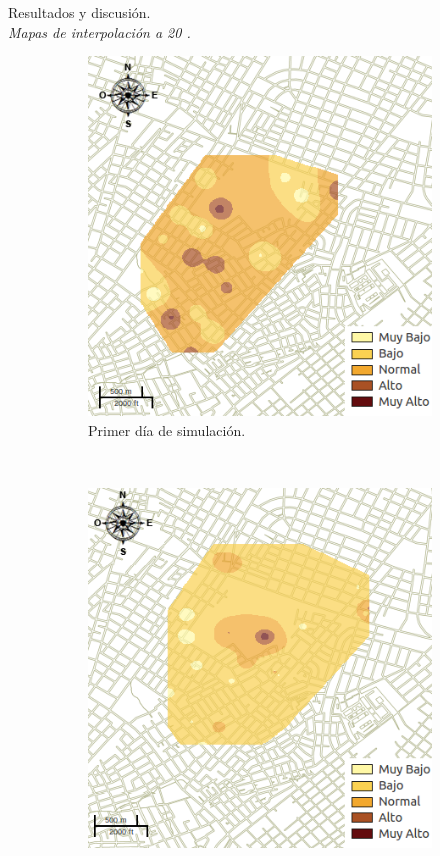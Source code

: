 \begin{frame}[t]{Resultados y discusión.\\\textit{Mapas de interpolación a 20 \textcelsius.}}
    \begin{figure}
    \begin{subfigure}[b]{0.45\textwidth}
        \includegraphics[width=\textwidth]{./graphics/inicial.png}
        \caption{ Primer día de simulación.}
    \end{subfigure}
    ~~~~
    \begin{subfigure}[b]{0.45\textwidth}
        \includegraphics[width=\textwidth]{./graphics/temp-20-final.png}

\end{subfigure}
\end{figure}
\end{frame}

